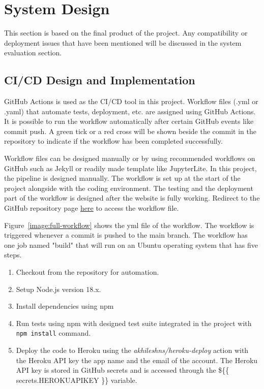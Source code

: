 \chapter{System Design}

This section is based on the final product of the project. Any compatibility or deployment issues that have been mentioned will be discussed in the system evaluation section.

\section{CI/CD Design and Implementation}
GitHub Actions is used as the CI/CD tool in this project. Workflow files (.yml or .yaml) that automate tests, deployment, etc. are assigned using GitHub Actions. It is possible to run the workflow automatically after certain GitHub events like commit push. A green tick or a red cross will be shown beside the commit in the repository to indicate if the workflow has been completed successfully.

Workflow files can be designed manually or by using recommended workflows on GitHub such as Jekyll or readily made template like JupyterLite. In this project, the pipeline is designed manually. The workflow is set up at the start of the project alongside with the coding environment. The testing and the deployment part of the workflow is designed after the website is fully working. Redirect to the GitHub repository page \href{https://github.com/gabhang/final-year-project}{here} to access the workflow file.

Figure~\ref{image:full-workflow} shows the yml file of the workflow. The workflow is triggered whenever a commit is pushed to the main branch. The workflow has one job named "build" that will run on an Ubuntu operating system that has five steps. 

\begin{enumerate}
  \item Checkout from the repository for automation.
  \item Setup Node.js version 18.x.
  \item Install dependencies using npm
  \item Run tests using npm with designed test suite integrated in the project with \texttt{npm install} command.
  \item Deploy the code to Heroku using the \textit{akhileshns/heroku-deploy} action with the Heroku API key the app name and the email of the account. The Heroku API key is stored in GitHub secrets and is accessed through the \$\{\{ secrets.HEROKU\textunderscore API\textunderscore KEY \}\} variable.
\end{enumerate}

